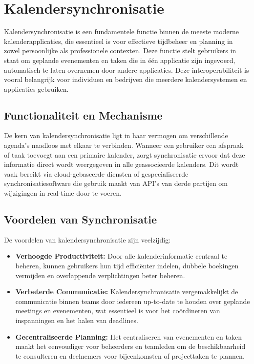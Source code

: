 \section{Kalendersynchronisatie}

Kalendersynchronisatie is een fundamentele functie binnen de meeste moderne kalenderapplicaties, die essentieel is voor effectieve tijdbeheer en planning in zowel persoonlijke als professionele contexten. Deze functie stelt gebruikers in staat om geplande evenementen en taken die in één applicatie zijn ingevoerd, automatisch te laten overnemen door andere applicaties. Deze interoperabiliteit is vooral belangrijk voor individuen en bedrijven die meerdere kalendersystemen en applicaties gebruiken.

\subsection{Functionaliteit en Mechanisme}
De kern van kalendersynchronisatie ligt in haar vermogen om verschillende agenda's naadloos met elkaar te verbinden. Wanneer een gebruiker een afspraak of taak toevoegt aan een primaire kalender, zorgt synchronisatie ervoor dat deze informatie direct wordt weergegeven in alle geassocieerde kalenders. Dit wordt vaak bereikt via cloud-gebaseerde diensten of gespecialiseerde synchronisatiesoftware die gebruik maakt van API's van derde partijen om wijzigingen in real-time door te voeren.

\subsection{Voordelen van Synchronisatie}
De voordelen van kalendersynchronisatie zijn veelzijdig:
\begin{itemize}
    \item \textbf{Verhoogde Productiviteit:} Door alle kalenderinformatie centraal te beheren, kunnen gebruikers hun tijd efficiënter indelen, dubbele boekingen vermijden en overlappende verplichtingen beter beheren.
    \item \textbf{Verbeterde Communicatie:} Kalendersynchronisatie vergemakkelijkt de communicatie binnen teams door iedereen up-to-date te houden over geplande meetings en evenementen, wat essentieel is voor het coördineren van inspanningen en het halen van deadlines.
    \item \textbf{Gecentraliseerde Planning:} Het centraliseren van evenementen en taken maakt het eenvoudiger voor beheerders en teamleden om de beschikbaarheid te consulteren en deelnemers voor bijeenkomsten of projecttaken te plannen.
\end{itemize}

